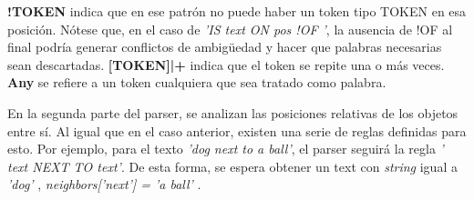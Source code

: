 \textbf{!TOKEN} indica que en ese patr\'on no puede haber un token tipo TOKEN en esa posici\'on. N\'otese que, en el caso de \textit{'IS text ON pos !OF '}, la ausencia de !OF al final podría generar conflictos de ambigüedad y hacer que palabras necesarias sean descartadas. \textbf{[TOKEN]|+} indica que el token se repite una o m\'as veces. \textbf{Any} se refiere a un token cualquiera que sea tratado como palabra.

En la segunda parte del parser, se analizan las posiciones relativas de los objetos entre sí. Al igual que en el caso anterior, existen una serie de reglas definidas para esto. Por ejemplo, para el texto \textit{'dog next to a ball'}, el parser seguirá la regla \textit{' text NEXT TO text'}. De esta forma, se espera obtener un text con \textit{string} igual a \textit{ 'dog' }, \textit{neighbors['next'] = 'a ball' }.

